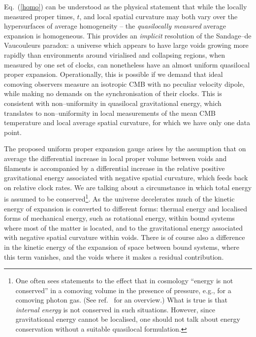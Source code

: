 \documentclass[12pt]{article}
\begin{document}
Eq.\ (\ref{homo}) can be understood as the physical statement that while
the locally measured proper times, $t$, and local spatial curvature may both
vary over the hypersurfaces of average homogeneity -- the {\em quasilocally
measured} average expansion is homogeneous. This provides an {\em implicit}
resolution of the Sandage--de Vaucouleurs paradox: a universe which appears
to have large voids growing more rapidly than environments around virialised
and collapsing regions, when measured by one set of clocks, can nonetheless
have an almost uniform quasilocal proper expansion.
Operationally, this is possible if we demand that
ideal comoving observers measure an isotropic CMB with no peculiar velocity
dipole, while making no demands on the synchronisation of their clocks.
This is consistent with non--uniformity in quasilocal gravitational
energy, which translates to non--uniformity in local measurements of the
mean CMB temperature and local average spatial curvature, for which we have
only one data point.

The proposed uniform proper expansion gauge arises by the assumption that on
average the differential increase in local proper volume between voids and
filaments is accompanied by a differential increase in the relative
positive gravitational energy associated with negative spatial curvature,
which feeds back on relative clock rates. We are talking about a circumstance
in which total energy is assumed to be conserved\footnote{One often sees
statements to the effect that in cosmology ``energy is not conserved'' in a
comoving volume in the presence of pressure, e.g., for a comoving photon
gas. (See ref.\ \cite{bary} for an overview.) What is true is that
{\em internal energy} is not conserved in such situations. However, since
gravitational energy cannot be localised, one should not talk about
energy conservation without a suitable quasilocal formulation.}. As the
universe decelerates much of the kinetic energy of expansion is converted to
different forms: thermal energy and localised forms of mechanical energy,
such as rotational energy, within bound systems where most of the matter is
located, and to the gravitational energy associated with negative spatial
curvature within voids. There is of course also a difference in the kinetic
energy of the expansion of space between bound systems, where this term
vanishes, and the voids where it makes a residual contribution.
\end{document}
